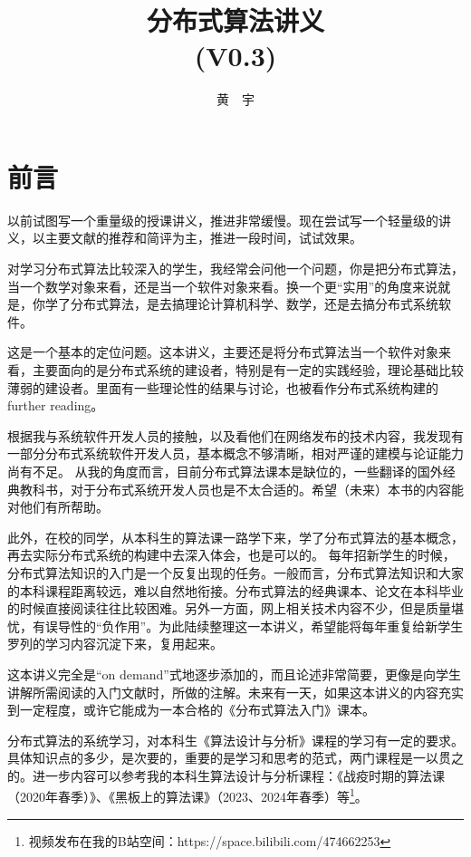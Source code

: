 \documentclass[UTF8]{ctexrep}
\begin{document}
\title{\Huge \bf 分布式算法讲义\\ {\large (V0.3)}}

\author{黄\ \ 宇}

\maketitle

\tableofcontents


\chapter*{前言}

以前试图写一个重量级的授课讲义，推进非常缓慢。现在尝试写一个轻量级的讲义，以主要文献的推荐和简评为主，推进一段时间，试试效果。

对学习分布式算法比较深入的学生，我经常会问他一个问题，你是把分布式算法，当一个数学对象来看，还是当一个软件对象来看。换一个更“实用”的角度来说就是，你学了分布式算法，是去搞理论计算机科学、数学，还是去搞分布式系统软件。

这是一个基本的定位问题。这本讲义，主要还是将分布式算法当一个软件对象来看，主要面向的是分布式系统的建设者，特别是有一定的实践经验，理论基础比较薄弱的建设者。里面有一些理论性的结果与讨论，也被看作分布式系统构建的further reading。

根据我与系统软件开发人员的接触，以及看他们在网络发布的技术内容，我发现有一部分分布式系统软件开发人员，基本概念不够清晰，相对严谨的建模与论证能力尚有不足。
从我的角度而言，目前分布式算法课本是缺位的，一些翻译的国外经典教科书，对于分布式系统开发人员也是不太合适的。希望（未来）本书的内容能对他们有所帮助。

此外，在校的同学，从本科生的算法课一路学下来，学了分布式算法的基本概念，再去实际分布式系统的构建中去深入体会，也是可以的。
每年招新学生的时候，分布式算法知识的入门是一个反复出现的任务。一般而言，分布式算法知识和大家的本科课程距离较远，难以自然地衔接。分布式算法的经典课本、论文在本科毕业的时候直接阅读往往比较困难。另外一方面，网上相关技术内容不少，但是质量堪忧，有误导性的“负作用”。为此陆续整理这一本讲义，希望能将每年重复给新学生罗列的学习内容沉淀下来，复用起来。

这本讲义完全是“on demand”式地逐步添加的，而且论述非常简要，更像是向学生讲解所需阅读的入门文献时，所做的注解。未来有一天，如果这本讲义的内容充实到一定程度，或许它能成为一本合格的《分布式算法入门》课本。

分布式算法的系统学习，对本科生《算法设计与分析》课程的学习有一定的要求。具体知识点的多少，是次要的，重要的是学习和思考的范式，两门课程是一以贯之的。进一步内容可以参考我的本科生算法设计与分析课程：《战疫时期的算法课（2020年春季）》、《黑板上的算法课》（2023、2024年春季）等\footnote{​视频发布在我的B站空间：https://space.bilibili.com/474662253}。
\end{document}
